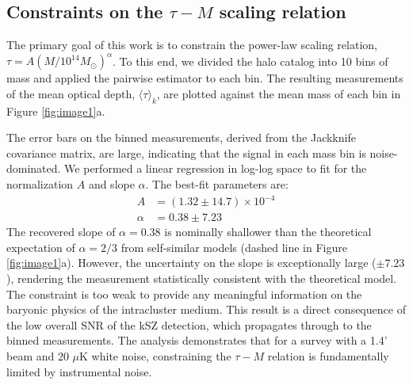 \documentclass[]{article}
\begin{document}
\subsection{Constraints on the $\tau-M$ scaling relation}

The primary goal of this work is to constrain the power-law scaling relation, $\tau = A (M / 10^{14} M_\odot)^\alpha$. To this end, we divided the halo catalog into 10 bins of mass and applied the pairwise estimator to each bin. The resulting measurements of the mean optical depth, $\langle \tau \rangle_k$, are plotted against the mean mass of each bin in Figure \ref{fig:image1}a.

The error bars on the binned measurements, derived from the Jackknife covariance matrix, are large, indicating that the signal in each mass bin is noise-dominated. We performed a linear regression in log-log space to fit for the normalization $A$ and slope $\alpha$. The best-fit parameters are:
\begin{align}
    A &= (1.32 \pm 14.7) \times 10^{-4} \\
    \alpha &= 0.38 \pm 7.23
\end{align}
The recovered slope of $\alpha = 0.38$ is nominally shallower than the theoretical expectation of $\alpha = 2/3$ from self-similar models (dashed line in Figure \ref{fig:image1}a). However, the uncertainty on the slope is exceptionally large ($\pm 7.23$), rendering the measurement statistically consistent with the theoretical model. The constraint is too weak to provide any meaningful information on the baryonic physics of the intracluster medium. This result is a direct consequence of the low overall SNR of the kSZ detection, which propagates through to the binned measurements. The analysis demonstrates that for a survey with a 1.4' beam and 20 $\mu$K white noise, constraining the $\tau-M$ relation is fundamentally limited by instrumental noise.
\end{document}
